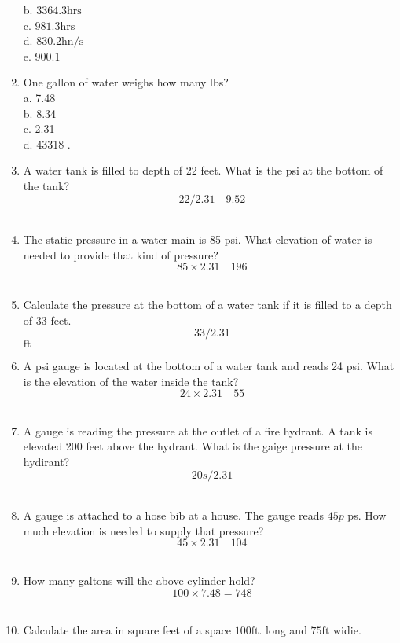 \begin{enumerate}
b. $3364.3 \mathrm{hrs}$\\
c. $981.3 \mathrm{hrs}$\\
d. $830.2 \mathrm{hn} / \mathrm{s}$\\
e. 900.1\\
\item One gallon of water weighs how many lbs?\\
a. 7.48\\
b. 8.34\\
c. 2.31\\
d. 43318 .\\
\item A water tank is filled to depth of 22 feet. What is the psi at the bottom of the tank?\\
$$
22 / 2.31 \quad 9.52
$$\\
\item The static pressure in a water main is 85 psi. What elevation of water is needed to provide that kind of pressure?\\
$$
85 \times 2.31 \quad 196
$$\\
\item Calculate the pressure at the bottom of a water tank if it is filled to a depth of 33 feet.\\
$$
33 / 2.31
$$
$\mathrm{ft}$\\
\item A psi gauge is located at the bottom of a water tank and reads 24 psi. What is the elevation of the water inside the tank?\\
$$
24 \times 2.31 \quad 55
$$\\
\item A gauge is reading the pressure at the outlet of a fire hydrant. A tank is elevated 200 feet above the hydrant. What is the gaige pressure at the hydirant?\\
$$
20 s / 2.31
$$\\
\item A gauge is attached to a hose bib at a house. The gauge reads $45 p$ ps. How much elevation is needed to supply that pressure?\\
$$
45 \times 2.31 \quad 104
$$\\
\item How many galtons will the above cylinder hold?\\
$$
100 \times 7.48=748
$$\\
\item Calculate the area in square feet of a space $100 \mathrm{ft}$. long and $75 \mathrm{ft}$ widie.\\

\end{enumerate}
